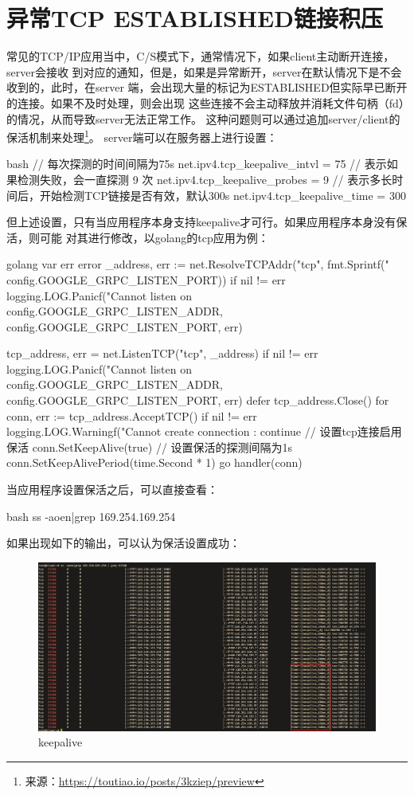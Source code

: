 \section{异常TCP ESTABLISHED链接积压}
常见的TCP/IP应用当中，C/S模式下，通常情况下，如果client主动断开连接，server会接收
到对应的通知，但是，如果是异常断开，server在默认情况下是不会收到的，此时，在server
端，会出现大量的标记为ESTABLISHED但实际早已断开的连接。如果不及时处理，则会出现
这些连接不会主动释放并消耗文件句柄（fd）的情况，从而导致server无法正常工作。
这种问题则可以通过追加server/client的保活机制来处理\footnote{来源：\url{https://toutiao.io/posts/3kziep/preview}}。
server端可以在服务器上进行设置：
\begin{code-block}{bash}
// 每次探测的时间间隔为75s
net.ipv4.tcp_keepalive_intvl = 75
// 表示如果检测失败，会一直探测 9 次
net.ipv4.tcp_keepalive_probes = 9
// 表示多长时间后，开始检测TCP链接是否有效，默认300s
net.ipv4.tcp_keepalive_time = 300
\end{code-block}
但上述设置，只有当应用程序本身支持keepalive才可行。如果应用程序本身没有保活，则可能
对其进行修改，以golang的tcp应用为例：
\begin{code-block}{golang}
var err error
_address, err := net.ResolveTCPAddr("tcp",
    fmt.Sprintf("%
        config.GOOGLE_GRPC_LISTEN_PORT))
if nil != err {
        logging.LOG.Panicf("Cannot listen on %
            config.GOOGLE_GRPC_LISTEN_ADDR,
            config.GOOGLE_GRPC_LISTEN_PORT, err)
}

tcp_address, err = net.ListenTCP("tcp", _address)
if nil != err {
        logging.LOG.Panicf("Cannot listen on %
            config.GOOGLE_GRPC_LISTEN_ADDR,
            config.GOOGLE_GRPC_LISTEN_PORT, err)
}
defer tcp_address.Close()
for {
        conn, err := tcp_address.AcceptTCP()
        if nil != err {
                logging.LOG.Warningf("Cannot create connection :%
                continue
        }
        // 设置tcp连接启用保活
        conn.SetKeepAlive(true)
        // 设置保活的探测间隔为1s
        conn.SetKeepAlivePeriod(time.Second * 1)
        go handler(conn)
}
\end{code-block}
当应用程序设置保活之后，可以直接查看：
\begin{code-block}{bash}
ss -aoen|grep 169.254.169.254
\end{code-block}
如果出现如下的输出，可以认为保活设置成功：
\begin{figure}[H]
  \centering
  \includegraphics[width=\linewidth]{keepalive.png}
  \caption{keepalive}
  \label{fig:keepalive}
\end{figure}
